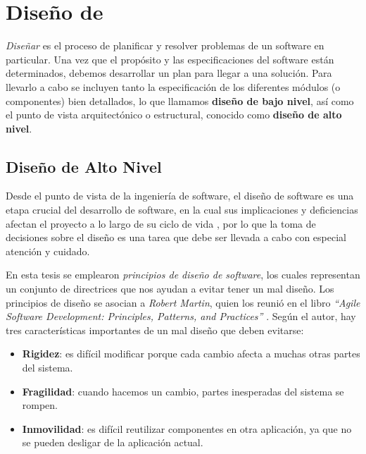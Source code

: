 \chapter{Diseño de \rc}

\textit{Diseñar} es el proceso de planificar y resolver problemas de un software en particular. Una vez que el propósito y las
especificaciones del software están determinados, debemos desarrollar un plan para llegar a una solución. Para llevarlo a cabo se incluyen
tanto la especificación de los diferentes módulos (o componentes) bien detallados, lo que llamamos \textbf{diseño de bajo nivel}, así como
el punto de vista arquitectónico o estructural, conocido como \textbf{diseño de alto nivel}.

\section{Diseño de Alto Nivel}

Desde el punto de vista de la ingeniería de software, el diseño de software es una etapa crucial del desarrollo de software, en la cual sus
implicaciones y deficiencias afectan el proyecto a lo largo de su ciclo de vida \cite{pressman}, por lo que la toma de decisiones sobre el
diseño es una tarea que debe ser llevada a cabo con especial atención y cuidado.

En esta tesis se emplearon \textit{principios de diseño de software}, los cuales representan un conjunto de directrices que nos ayudan a
evitar tener un mal diseño. Los principios de diseño se asocian a \textit{Robert Martin}, quien los reunió en el libro \textit{``Agile
Software Development: Principles, Patterns, and Practices''} \cite{martin-asd}. Según el autor, hay tres características importantes de un
mal diseño que deben evitarse:
\begin{itemize}
    \item   \textbf{Rigidez}: es difícil modificar porque cada cambio afecta a muchas otras partes del sistema.
    \item   \textbf{Fragilidad}: cuando hacemos un cambio, partes inesperadas del sistema se rompen.
    \item   \textbf{Inmovilidad}: es difícil reutilizar componentes en otra aplicación, ya que no se pueden desligar de la aplicación
            actual.
\end{itemize}
        
